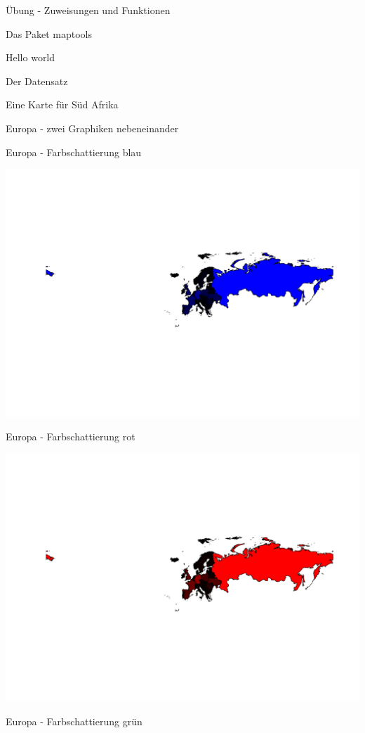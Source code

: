 \documentclass[ignorenonframetext,]{beamer}
\begin{document}
\begin{frame}[fragile]{Übung - Zuweisungen und Funktionen}
\begin{frame}[fragile]{Das Paket maptools}
\begin{frame}[fragile]{Hello world}
\begin{frame}[fragile]{Der Datensatz}
\begin{frame}[fragile]{Eine Karte für Süd Afrika}
\begin{frame}[fragile]{Europa - zwei Graphiken nebeneinander}
\end{frame}

\begin{frame}{Europa - Farbschattierung blau}

\includegraphics{Geomedizin_files/figure-beamer/unnamed-chunk-100-1.pdf}

\end{frame}

\begin{frame}{Europa - Farbschattierung rot}

\includegraphics{Geomedizin_files/figure-beamer/unnamed-chunk-101-1.pdf}

\end{frame}

\begin{frame}{Europa - Farbschattierung grün}


\end{frame}
\end{frame}
\end{frame}
\end{frame}
\end{frame}
\end{frame}
\end{document}
